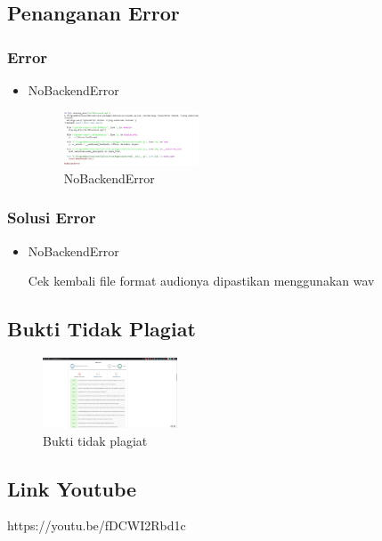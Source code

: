 \subsection{Penanganan Error}
\subsubsection{Error}
\hfill\break
\begin{itemize}
\item NoBackendError

\begin{figure}[H]
\centering
	\includegraphics[width=4cm]{figures/1174053/6/error1.jpg}
\caption{NoBackendError}
\end{figure}
\end{itemize}
\subsubsection{Solusi Error}
\hfill\break
\begin{itemize}
\item NoBackendError

Cek kembali file format audionya dipastikan menggunakan wav
\end{itemize}

\subsection{Bukti Tidak Plagiat}
\begin{figure}[H]
	\includegraphics[width=4cm]{figures/1174053/6/buktiplagiat.jpg}
	\centering
	\caption{Bukti tidak plagiat}
\end{figure}

\subsection{Link Youtube}
https://youtu.be/fDCWI2Rbd1c